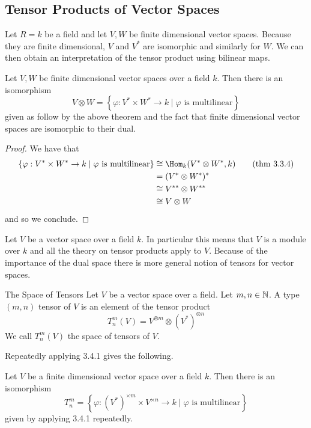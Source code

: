 \documentclass[a4paper]{article}
\begin{document}
\subsection{Tensor Products of Vector Spaces}
Let $R=k$ be a field and let $V,W$ be finite dimensional vector spaces. Because they are finite dimensional, $V$ and $V^\ast$ are isomorphic and similarly for $W$. We can then obtain an interpretation of the tensor product using bilinear maps. 

\begin{crl}{}{} Let $V,W$ be finite dimensional vector spaces over a field $k$. Then there is an isomorphism $$V\otimes W=\left\{\varphi:V^\ast\times W^\ast\to k\;|\;\varphi\text{ is multilinear}\right\}$$ given as follow by the above theorem and the fact that finite dimensional vector spaces are isomorphic to their dual. 
\begin{proof}
We have that 
\begin{align*}
\left\{\varphi:V^\ast\times W^\ast\to k\;|\;\varphi\text{ is multilinear}\right\}&\cong\Hom_k(V^\ast\otimes W^\ast,k)\tag{thm 3.3.4}\\
&=(V^\ast\otimes W^\ast)^\ast\\
&\cong V^{\ast\ast}\otimes W^{\ast\ast}\\
&\cong V\otimes W
\end{align*}
and so we conclude. 
\end{proof}
\end{crl}

Let $V$ be a vector space over a field $k$. In particular this means that $V$ is a module over $k$ and all the theory on tensor products apply to $V$. Because of the importance of the dual space there is more general notion of tensors for vector spaces. 

\begin{defn}{The Space of Tensors}{} Let $V$ be a vector space over a field. Let $m,n\in\mathbb{N}$. A type $(m,n)$ tensor of $V$ is an element of the tensor product $$T_n^m(V)=V^{\otimes m}\otimes(V^\ast)^{\otimes n}$$ We call $T_n^m(V)$ the space of tensors of $V$. 
\end{defn}

Repeatedly applying 3.4.1 gives the following. 

\begin{thm}{}{} Let $V$ be a finite dimensional vector space over a field $k$. Then there is an isomorphism $$T_n^m=\left\{\varphi:(V^\ast)^{\times m}\times V^{\times n}\to k\;|\;\varphi\text{ is multilinear}\right\}$$ given by applying 3.4.1 repeatedly. 
\end{thm}
\end{document}
